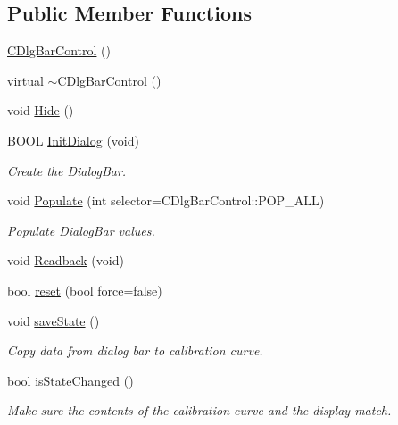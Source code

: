 \subsection*{Public Member Functions}
\begin{DoxyCompactItemize}
\item 
\hyperlink{classCDlgBarControl_a7b82b85a5702c9b1cf48e87edb0a03bf}{CDlgBarControl} ()
\item 
virtual \hyperlink{classCDlgBarControl_ac5b08790fb10e48f4ba3dc94b9197ba7}{$\sim$CDlgBarControl} ()
\item 
void \hyperlink{classCDlgBarControl_a99ae8d6cf20bfc5a8707389a4d4db229}{Hide} ()
\item 
BOOL \hyperlink{classCDlgBarControl_aa633dbee1d1af573ed48215f01583a06}{InitDialog} (void)
\begin{DoxyCompactList}\small\item\em Create the DialogBar. \item\end{DoxyCompactList}\item 
void \hyperlink{classCDlgBarControl_a03733935167c4c0dba424690b0c1053f}{Populate} (int selector=CDlgBarControl::POP\_\-ALL)
\begin{DoxyCompactList}\small\item\em Populate DialogBar values. \item\end{DoxyCompactList}\item 
void \hyperlink{classCDlgBarControl_a90e97b04a057964696c4982a3c499715}{Readback} (void)
\item 
bool \hyperlink{classCDlgBarControl_a1be0bb1d43cd0358a415da18b6fef612}{reset} (bool force=false)
\item 
void \hyperlink{classCDlgBarControl_a4b9f49ddc6c44b7e79280059801cbb43}{saveState} ()
\begin{DoxyCompactList}\small\item\em Copy data from dialog bar to calibration curve. \item\end{DoxyCompactList}\item 
bool \hyperlink{classCDlgBarControl_a5f0ab8258357a8bd54226b2a467ec9ea}{isStateChanged} ()
\begin{DoxyCompactList}\small\item\em Make sure the contents of the calibration curve and the display match. \item\end{DoxyCompactList}\item 

\end{DoxyCompactItemize}
